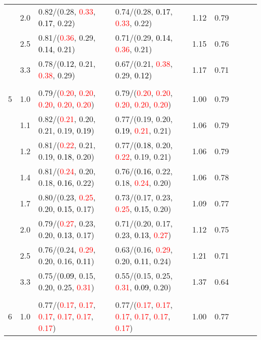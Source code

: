 \documentclass[10pt,a4paper]{report}
\begin{document}
\begin{table}[!htbp]
\begin{center}
{\begin{tabular}{ccllccccc}
			&2.0&0.82/(0.28, \textcolor{red}{0.33}, \textcolor{black}{0.17}, 0.22)&0.74/(0.28, \textcolor{black}{0.17}, \textcolor{red}{0.33}, 0.22)&1.12&0.79\\
			&2.5&0.81/(\textcolor{red}{0.36}, 0.29, \textcolor{black}{0.14}, 0.21)&0.71/(0.29, \textcolor{black}{0.14}, \textcolor{red}{0.36}, 0.21)&1.15&0.76\\
			&3.3&0.78/(\textcolor{black}{0.12}, 0.21, \textcolor{red}{0.38}, 0.29)&0.67/(0.21, \textcolor{red}{0.38}, 0.29, \textcolor{black}{0.12})&1.17&0.71\\
			&&&&\\
			5			&1.0&0.79/(\textcolor{red}{0.20}, \textcolor{red}{0.20}, \textcolor{red}{0.20}, \textcolor{red}{0.20}, \textcolor{red}{0.20})&0.79/(\textcolor{red}{0.20}, \textcolor{red}{0.20}, \textcolor{red}{0.20}, \textcolor{red}{0.20}, \textcolor{red}{0.20})&1.00&0.79\\
			&1.1&0.82/(\textcolor{red}{0.21}, 0.20, 0.21, 0.19, \textcolor{black}{0.19})&0.77/(0.19, 0.20, \textcolor{black}{0.19}, \textcolor{red}{0.21}, 0.21)&1.06&0.79\\
			&1.2&0.81/(\textcolor{red}{0.22}, 0.21, 0.19, \textcolor{black}{0.18}, 0.20)&0.77/(\textcolor{black}{0.18}, 0.20, \textcolor{red}{0.22}, 0.19, 0.21)&1.06&0.79\\
			&1.4&0.81/(\textcolor{red}{0.24}, 0.20, 0.18, \textcolor{black}{0.16}, 0.22)&0.76/(\textcolor{black}{0.16}, 0.22, 0.18, \textcolor{red}{0.24}, 0.20)&1.06&0.78\\
			&1.7&0.80/(0.23, \textcolor{red}{0.25}, 0.20, \textcolor{black}{0.15}, 0.17)&0.73/(0.17, 0.23, \textcolor{red}{0.25}, \textcolor{black}{0.15}, 0.20)&1.09&0.77\\
			&2.0&0.79/(\textcolor{red}{0.27}, 0.23, 0.20, \textcolor{black}{0.13}, 0.17)&0.71/(0.20, 0.17, 0.23, \textcolor{black}{0.13}, \textcolor{red}{0.27})&1.12&0.75\\
			&2.5&0.76/(0.24, \textcolor{red}{0.29}, 0.20, 0.16, \textcolor{black}{0.11})&0.63/(0.16, \textcolor{red}{0.29}, 0.20, \textcolor{black}{0.11}, 0.24)&1.21&0.71\\
			&3.3&0.75/(\textcolor{black}{0.09}, 0.15, 0.20, 0.25, \textcolor{red}{0.31})&0.55/(0.15, 0.25, \textcolor{red}{0.31}, \textcolor{black}{0.09}, 0.20)&1.37&0.64\\
			&&&&\\
			6			&1.0&0.77/(\textcolor{red}{0.17}, \textcolor{red}{0.17}, \textcolor{red}{0.17}, \textcolor{red}{0.17}, \textcolor{red}{0.17}, \textcolor{red}{0.17})&0.77/(\textcolor{red}{0.17}, \textcolor{red}{0.17}, \textcolor{red}{0.17}, \textcolor{red}{0.17}, \textcolor{red}{0.17}, \textcolor{red}{0.17})&1.00&0.77\\

\end{tabular}}
\end{center}
\end{table}
\end{document}
